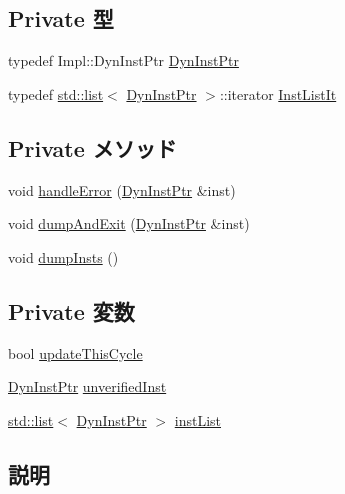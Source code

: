 \subsection*{Private 型}
\begin{DoxyCompactItemize}
\item 
typedef Impl::DynInstPtr \hyperlink{classChecker_a028ce10889c5f6450239d9e9a7347976}{DynInstPtr}
\item 
typedef \hyperlink{classstd_1_1list}{std::list}$<$ \hyperlink{classChecker_a028ce10889c5f6450239d9e9a7347976}{DynInstPtr} $>$::iterator \hyperlink{classChecker_a4da46d72d68fcd5bfe65dc701c358379}{InstListIt}
\end{DoxyCompactItemize}
\subsection*{Private メソッド}
\begin{DoxyCompactItemize}
\item 
void \hyperlink{classChecker_a761ba7749af782d41357ddb6bffb7bd7}{handleError} (\hyperlink{classChecker_a028ce10889c5f6450239d9e9a7347976}{DynInstPtr} \&inst)
\item 
void \hyperlink{classChecker_a03be99814b51ddc0835a81391dd174e7}{dumpAndExit} (\hyperlink{classChecker_a028ce10889c5f6450239d9e9a7347976}{DynInstPtr} \&inst)
\item 
void \hyperlink{classChecker_a80587b4fe043bbe1995536cb3b361588}{dumpInsts} ()
\end{DoxyCompactItemize}
\subsection*{Private 変数}
\begin{DoxyCompactItemize}
\item 
bool \hyperlink{classChecker_af852d5346faaffd68d81b10fee071300}{updateThisCycle}
\item 
\hyperlink{classChecker_a028ce10889c5f6450239d9e9a7347976}{DynInstPtr} \hyperlink{classChecker_a2d37ecd523121ea3770b0b2c4264dce4}{unverifiedInst}
\item 
\hyperlink{classstd_1_1list}{std::list}$<$ \hyperlink{classChecker_a028ce10889c5f6450239d9e9a7347976}{DynInstPtr} $>$ \hyperlink{classChecker_ae10a391d02ce1ef67ee13cd82b7d46e5}{instList}
\end{DoxyCompactItemize}


\subsection{説明}
